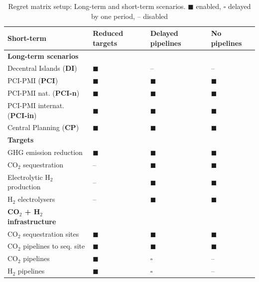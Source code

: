 \documentclass[pdflatex,sn-nature]{sn-jnl}%
\theoremstyle{thmstyleone}%
\theoremstyle{thmstyletwo}%
\theoremstyle{thmstylethree}%
\begin{document}
\begin{table}[t]
  \centering
  \caption{Regret matrix setup: Long-term and short-term scenarios. $\blacksquare$ enabled, $\square$ delayed by one period, -- disabled}
  \label{tab:regret_matrix_setup}
  \scriptsize
  \begin{tabularx}{\linewidth}{R{4.2cm}>{\centering\arraybackslash}X>{\centering\arraybackslash}X>{\centering\arraybackslash}X}
    \toprule
    \textbf{Short-term} & \textbf{Reduced targets} & \textbf{Delayed pipelines} & \textbf{No pipelines} \\
    \midrule
    \textbf{Long-term scenarios} & & & \\
    Decentral Islands (\textbf{DI}) & $\blacksquare$ & -- & -- \\
    PCI-PMI (\textbf{PCI}) & $\blacksquare$ & $\blacksquare$ & $\blacksquare$ \\
    PCI-PMI nat. (\textbf{PCI-n}) & $\blacksquare$ & $\blacksquare$ & $\blacksquare$\\
    PCI-PMI internat. (\textbf{PCI-in}) & $\blacksquare$ & $\blacksquare$ & $\blacksquare$ \\
    Central Planning (\textbf{CP}) & $\blacksquare$ & $\blacksquare$ & $\blacksquare$ \\
    \midrule
    \textbf{Targets} & & & \\
    GHG emission reduction &  $\blacksquare$ &  $\blacksquare$ &  $\blacksquare$ \\
    CO$_2$ sequestration &  -- &  $\blacksquare$ &  $\blacksquare$ \\
    Electrolytic H$_2$ production &  -- &  $\blacksquare$ &  $\blacksquare$ \\
    H$_2$ electrolysers &  -- &  $\blacksquare$ &  $\blacksquare$ \\
    \midrule
    \textbf{CO$_2$ + H$_2$ infrastructure} & & & \\
    CO$_2$ sequestration sites & $\blacksquare$ &  $\blacksquare$ &  $\blacksquare$ \\
    CO$_2$ pipelines to seq. site & $\blacksquare$ &  $\blacksquare$ &  $\blacksquare$ \\
    CO$_2$ pipelines & $\blacksquare$ &  $\square$ &  -- \\
    H$_2$ pipelines & $\blacksquare$ &  $\square$ &  -- \\
    \bottomrule
  \end{tabularx}
\end{table}
\end{document}
